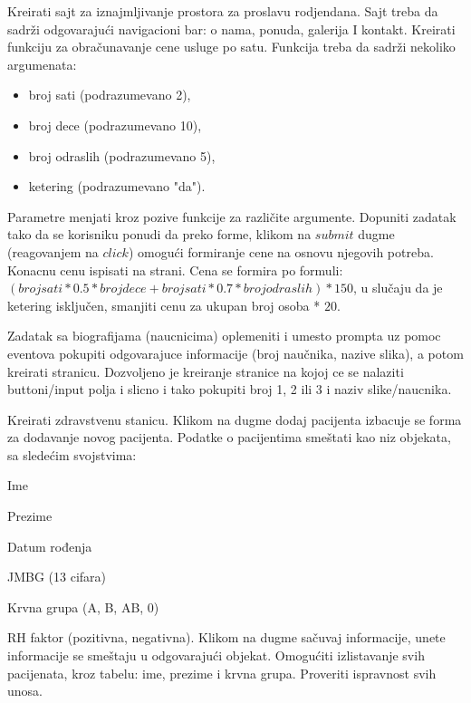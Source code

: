 \begin{primer}
Kreirati sajt za iznajmljivanje prostora za proslavu rodjendana. Sajt treba da sadrži odgovarajući
 navigacioni bar: o nama, ponuda, galerija I kontakt. 
 Kreirati funkciju za obračunavanje cene usluge po satu. 
 Funkcija treba da sadrži nekoliko argumenata:
\begin{itemize}
 \item broj sati (podrazumevano 2), 
 \item broj dece (podrazumevano 10),
 \item broj odraslih (podrazumevano 5),
 \item ketering (podrazumevano "da"). 
\end{itemize}  
Parametre menjati kroz pozive funkcije za različite argumente. Dopuniti zadatak tako da se korisniku
ponudi da preko forme, klikom na $submit$ dugme (reagovanjem na $click$) omogući formiranje cene 
na osnovu njegovih potreba. Konacnu cenu ispisati na strani.  
Cena se formira po formuli:
     $(brojsati*0.5*brojdece + brojsati*0.7*brojodraslih) *150$, 
u slučaju da je ketering isključen, smanjiti cenu za ukupan broj osoba * $20$. 
\end{primer}

\begin{primer}
Zadatak sa biografijama (naucnicima) oplemeniti i umesto prompta uz pomoc eventova
pokupiti odgovarajuce informacije (broj naučnika, nazive slika), a potom kreirati stranicu. Dozvoljeno je kreiranje stranice na kojoj ce se nalaziti buttoni/input polja i slicno i tako pokupiti broj 1, 2 ili 3 i naziv slike/naucnika.
\end{primer}

\begin{primer}
Kreirati zdravstvenu stanicu. Klikom na dugme dodaj pacijenta izbacuje se forma za dodavanje novog pacijenta. Podatke o pacijentima smeštati kao niz objekata, sa sledećim svojstvima:
\item Ime
\item Prezime
\item Datum rođenja
\item JMBG (13 cifara)
\item Krvna grupa (A, B, AB, 0)
\item RH faktor (pozitivna, negativna).
Klikom na dugme sačuvaj informacije, unete informacije se smeštaju u odgovarajući 
objekat. Omogućiti izlistavanje svih pacijenata, kroz tabelu: ime, prezime i krvna grupa.
Proveriti ispravnost svih unosa.
\end{primer}

